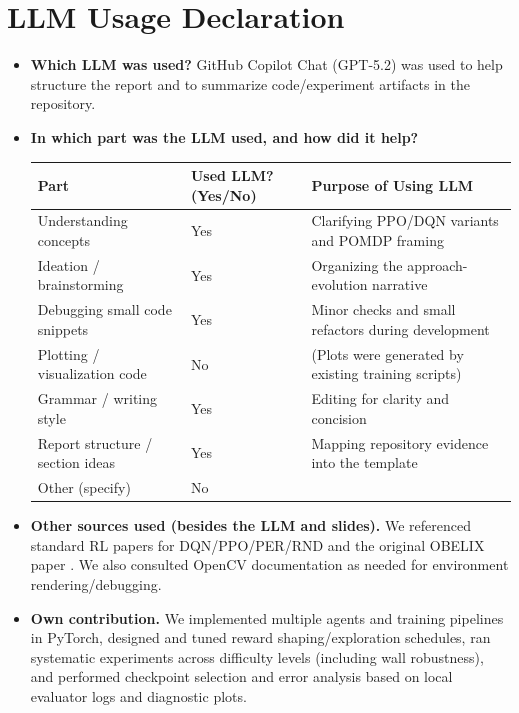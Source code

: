 \documentclass[11pt, oneside]{article}    %
\begin{document}
\section*{LLM Usage Declaration}
\begin{itemize}
\item \textbf{Which LLM was used?} GitHub Copilot Chat (GPT-5.2) was used to help structure the report and to summarize code/experiment artifacts in the repository.

\item \textbf{In which part was the LLM used, and how did it help?}

\begin{tabular}{l|l|l}
\toprule
Part & Used LLM? (Yes/No) & Purpose of Using LLM \\
\midrule
Understanding concepts & Yes & Clarifying PPO/DQN variants and POMDP framing \\
Ideation / brainstorming & Yes & Organizing the approach-evolution narrative \\
Debugging small code snippets & Yes & Minor checks and small refactors during development \\
Plotting / visualization code & No & (Plots were generated by existing training scripts) \\
Grammar / writing style & Yes & Editing for clarity and concision \\
Report structure / section ideas & Yes & Mapping repository evidence into the template \\
Other (specify) & No &  \\
\bottomrule
\end{tabular}

\item \textbf{Other sources used (besides the LLM and slides).} We referenced standard RL papers for DQN/PPO/PER/RND and the original OBELIX paper \citep{mahadevan1991automatic}. We also consulted OpenCV documentation as needed for environment rendering/debugging.

\item \textbf{Own contribution.} We implemented multiple agents and training pipelines in PyTorch, designed and tuned reward shaping/exploration schedules, ran systematic experiments across difficulty levels (including wall robustness), and performed checkpoint selection and error analysis based on local evaluator logs and diagnostic plots.
\end{itemize}

\vspace{2cm}




\end{document}
